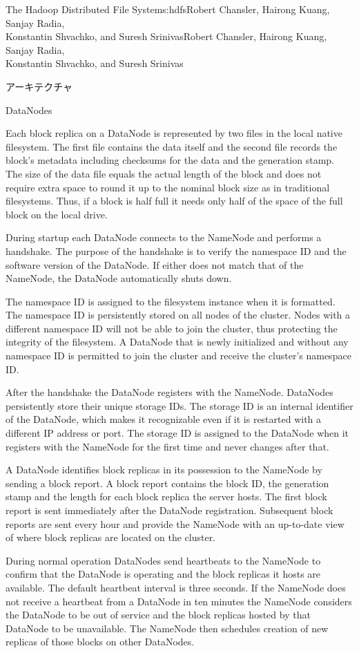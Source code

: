 \begin{aosachaptertoc}{The Hadoop Distributed File System}{s:hdfs}{Robert Chansler, Hairong Kuang, Sanjay Radia, \\ Konstantin Shvachko, and Suresh Srinivas}{Robert Chansler, Hairong Kuang, Sanjay Radia, \\ \hspace*{0.9cm} Konstantin Shvachko, and Suresh Srinivas}
\begin{aosasect1}{アーキテクチャ}
\begin{aosasect2}{DataNodes}

Each block replica on a DataNode is represented by two files in the
local native filesystem. The first file contains the data itself and
the second file records the block's metadata including checksums for
the data and the generation stamp. The size of the data file equals
the actual length of the block and does not require extra space to
round it up to the nominal block size as in traditional
filesystems. Thus, if a block is half full it needs only half of the
space of the full block on the local drive.

During startup each DataNode connects to the NameNode and performs a
handshake. The purpose of the handshake is to verify the namespace ID
and the software version of the DataNode. If either does not match
that of the NameNode, the DataNode automatically shuts down.

The namespace ID is assigned to the filesystem instance when it is
formatted. The namespace ID is persistently stored on all nodes of the
cluster. Nodes with a different namespace ID will not be able to join
the cluster, thus protecting the integrity of the filesystem. A
DataNode that is newly initialized and without any namespace ID is
permitted to join the cluster and receive the cluster's namespace ID.

After the handshake the DataNode registers with the
NameNode. DataNodes persistently store their unique storage IDs. The
storage ID is an internal identifier of the DataNode, which makes it
recognizable even if it is restarted with a different IP address or
port. The storage ID is assigned to the DataNode when it registers
with the NameNode for the first time and never changes after that.

A DataNode identifies block replicas in its possession to the NameNode
by sending a block report. A block report contains the block ID, the
generation stamp and the length for each block replica the server
hosts. The first block report is sent immediately after the DataNode
registration. Subsequent block reports are sent every hour and provide
the NameNode with an up-to-date view of where block replicas are
located on the cluster.

During normal operation DataNodes send heartbeats to the NameNode to
confirm that the DataNode is operating and the block replicas it hosts
are available. The default heartbeat interval is three seconds. If the
NameNode does not receive a heartbeat from a DataNode in ten minutes
the NameNode considers the DataNode to be out of service and the block
replicas hosted by that DataNode to be unavailable. The NameNode then
schedules creation of new replicas of those blocks on other DataNodes.


\end{aosasect2}
\end{aosasect1}
\end{aosachaptertoc}
